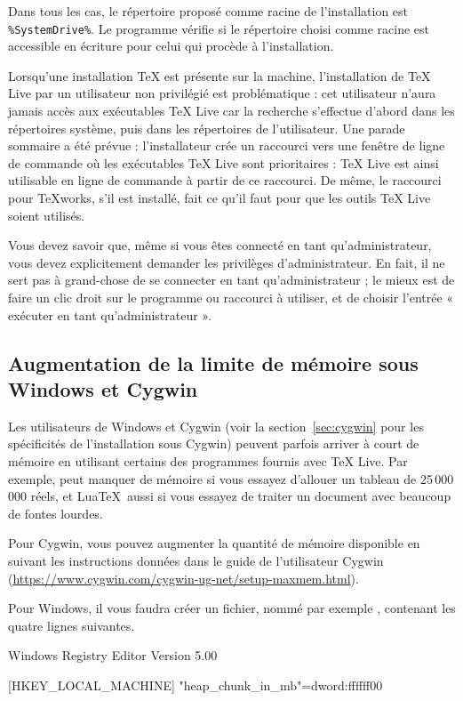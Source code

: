 \documentclass[german, english, french]{article}
\renewcommand{\TL}{\TeX{} Live\xspace}%
\begin{document}
Dans tous les cas, le répertoire proposé comme racine de l'installation est
\verb|%SystemDrive%|. %
Le programme  vérifie si le répertoire choisi comme racine est
accessible en écriture pour celui qui procède à l'installation.

Lorsqu'une installation \TeX{} est présente sur la machine, l'installation de
\TL{} par un utilisateur non privilégié est problématique : cet utilisateur
n'aura jamais accès aux exécutables \TL{} car la recherche s'effectue d'abord
dans les répertoires système, puis dans les répertoires de l'utilisateur.  Une
parade sommaire a été prévue : l'installateur crée un raccourci vers une fenêtre
de ligne de commande où les exécutables \TL sont prioritaires : \TL{} est ainsi
utilisable en ligne de commande à partir de ce raccourci. De même, le raccourci
pour \TeX{}works, s'il est installé, fait ce qu'il faut pour que les outils \TL
soient utilisés.

Vous devez savoir que, même si vous êtes connecté en tant qu'administrateur,
vous devez explicitement demander les privilèges d'administrateur.  En fait, il
ne sert pas à grand-chose de se connecter en tant qu'administrateur ; le mieux
est de faire un clic droit sur le programme ou raccourci à utiliser, et de
choisir l'entrée « exécuter en tant qu'administrateur ».


\subsection{Augmentation de la limite de mémoire sous Windows et Cygwin}
\label{sec:cygwin-maxmem}

Les utilisateurs de Windows et Cygwin (voir la section~\ref{sec:cygwin} pour les
spécificités de l'installation sous Cygwin) peuvent parfois arriver à court de
mémoire en utilisant certains des programmes fournis avec \TL. Par exemple,
 peut manquer de mémoire si vous essayez d'allouer un tableau de
25\,000\,000 réels, et Lua\TeX\ aussi si vous essayez de traiter un document
avec beaucoup de fontes lourdes.

Pour Cygwin, vous pouvez augmenter la quantité de mémoire disponible en suivant
les instructions données dans le guide de l'utilisateur Cygwin
(\url{https://www.cygwin.com/cygwin-ug-net/setup-maxmem.html}).

Pour Windows, il vous faudra créer un fichier, nommé par exemple
, contenant les quatre lignes suivantes.

\begin{sverbatim}
Windows Registry Editor Version 5.00

[HKEY_LOCAL_MACHINE\Software\Cygwin]
"heap_chunk_in_mb"=dword:ffffff00
\end{sverbatim}
\end{document}
